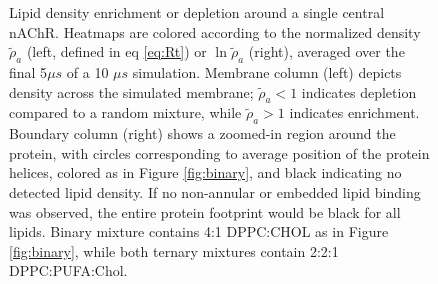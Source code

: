 	\begin{figure}[ht!]
		\begin{flushleft}

		\caption[Lipid density enrichment or depletion around a single central nAChR.] {Lipid density enrichment or depletion around a single central nAChR. Heatmaps are colored according to the normalized density $\tilde{\rho}_{a}$ (left, defined in eq \ref{eq:Rt}) or $\ln\tilde{\rho}_{a}$ (right), averaged over the final 5$\mu s$ of a 10 $\mu s$ simulation. Membrane column (left) depicts density across the simulated membrane; $\tilde{\rho}_{a}<1$ indicates depletion compared to a random mixture, while $\tilde{\rho}_{a}>1$ indicates enrichment. Boundary column (right) shows a zoomed-in region around the protein, with circles corresponding to average position of the protein helices, colored as in Figure \ref{fig:binary}, and black indicating no detected lipid density. If no non-annular or embedded lipid binding was observed, the entire protein footprint would be black for all lipids. Binary mixture contains 4:1 DPPC:CHOL as in Figure \ref{fig:binary}, while both ternary mixtures contain 2:2:1 DPPC:PUFA:Chol.} \label{fig:sorting}

		\end{flushleft}

			\end{figure}
	
